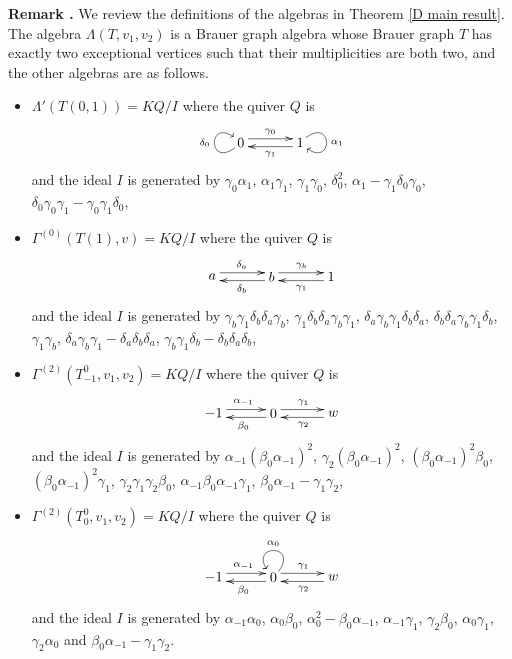 \documentclass[12pt]{amsart}
\def \remark{\refstepcounter{thm} \par\medskip\noindent
                \textbf{Remark \thethm .} }
\numberwithin{equation}{thm}
\newcounter{ni}
\begin{document}
{\remark
We review the definitions of the algebras in Theorem \ref{D main result}. The algebra $\Lambda(T,v_1,v_2)$ 
is a Brauer graph algebra whose Brauer graph $T$ has exactly two exceptional vertices such that 
their multiplicities are both two, and the other algebras are as follows. 
\begin{itemize}
\item
$\Lambda'(T(0,1))=KQ/I$ where the quiver $Q$ is
\[
\begin{xy}
(0,0) *[o]+{0}="A", (15,0) *[o]+{1}="B",
\ar @<1mm> "A";"B"^{\gamma_0}
\ar @<1mm> "B";"A"^{\gamma_1}
\SelectTips{eu}{}
\ar @(dl,ul) "A";"A"^{\delta_0}
\ar @(ur,dr) "B";"B"^{\alpha_1}
\end{xy}
\]
and the ideal $I$ is generated by 
$\gamma_0\alpha_1$, $\alpha_1\gamma_1$, $\gamma_1\gamma_0$, $\delta_0^2$, 
$\alpha_1-\gamma_1\delta_0\gamma_0$, $\delta_0\gamma_0\gamma_1-\gamma_0\gamma_1\delta_0$,
\item
$\Gamma^{(0)}(T(1),v)=KQ/I$ where the quiver $Q$ is
\[
\begin{xy}
(0,0) *[o]+{a}="A", (15,0) *[o]+{b}="B", (30,0) *[o]+{1}="C",
\ar @<1mm> "A";"B"^{\delta_a}
\ar @<1mm> "B";"C"^{\gamma_b}
\ar @<1mm> "B";"A"^{\delta_b}
\ar @<1mm> "C";"B"^{\gamma_1}
\end{xy}
\]
and the ideal $I$ is generated by 
$\gamma_b\gamma_1\delta_b\delta_a\gamma_b$, $\gamma_1\delta_b\delta_a\gamma_b\gamma_1$, 
$\delta_a\gamma_b\gamma_1\delta_b\delta_a$, $\delta_b\delta_a\gamma_b\gamma_1\delta_b$, $\gamma_1\gamma_b$,
$\delta_a\gamma_b\gamma_1-\delta_a\delta_b\delta_a$, $\gamma_b\gamma_1\delta_b-\delta_b\delta_a\delta_b$,
\item
$\Gamma^{(2)}(T^0_{-1},v_1,v_2)=KQ/I$ where the quiver $Q$ is
\[
\begin{xy}
(0,0) *[o]+{-1}="A", (15,0) *[o]+{0}="B", (30,0) *[o]+{w}="C",
\ar @<1mm> "A";"B"^{\alpha_{-1}}
\ar @<1mm> "B";"C"^{\gamma_1}
\ar @<1mm> "B";"A"^{\beta_0}
\ar @<1mm> "C";"B"^{\gamma_2}
\end{xy}
\]
and the ideal $I$ is generated by 
$\alpha_{-1}(\beta_0\alpha_{-1})^2$, $\gamma_2(\beta_0\alpha_{-1})^2$, $(\beta_0\alpha_{-1})^2\beta_0$, 
$(\beta_0\alpha_{-1})^2\gamma_1$, $\gamma_2\gamma_1\gamma_2\beta_0$,
$\alpha_{-1}\beta_0\alpha_{-1}\gamma_1$, $\beta_0\alpha_{-1}-\gamma_1\gamma_2$,
\item
$\Gamma^{(2)}(T^0_0,v_1,v_2)=KQ/I$ where the quiver $Q$ is
\[
\begin{xy}
(0,0) *[o]+{-1}="A", (15,0) *[o]+{0}="B", (30,0) *[o]+{w}="C",
\ar @<1mm> "A";"B"^{\alpha_{-1}}
\ar @<1mm> "B";"C"^{\gamma_1}
\ar @<1mm> "B";"A"^{\beta_0}
\ar @<1mm> "C";"B"^{\gamma_2}
\SelectTips{eu}{}
\ar @(ru,lu) "B";"B"_{\alpha_0}
\end{xy}
\]
and the ideal $I$ is generated by
$\alpha_{-1}\alpha_0$, $\alpha_0\beta_0$, $\alpha_0^2-\beta_0\alpha_{-1}$, 
$\alpha_{-1}\gamma_1$, $\gamma_2\beta_0$, $\alpha_0\gamma_1$, 
$\gamma_2\alpha_0$ and $\beta_0\alpha_{-1}-\gamma_1\gamma_2$. 
\end{itemize}


}
\end{document}
